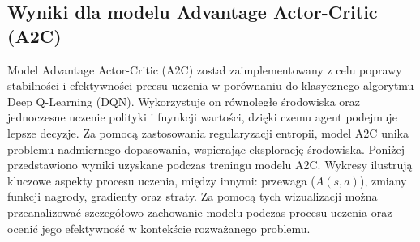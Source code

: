 \documentclass[a4paper, 12pt]{article}
\begin{document}
    \subsection{Wyniki dla modelu Advantage Actor-Critic (A2C)}
    Model Advantage Actor-Critic (A2C) został zaimplementowany z celu poprawy stabilności i efektywności prcesu uczenia w porównaniu do klasycznego algorytmu Deep Q-Learning (DQN).
    Wykorzystuje on równoległe środowiska oraz jednoczesne uczenie polityki i fuynkcji wartości, dzięki czemu agent podejmuje lepsze decyzje. 
    Za pomocą zastosowania regularyzacji entropii, model A2C unika problemu nadmiernego dopasowania, wspierając eksplorację środowiska.
    Poniżej przedstawiono wyniki uzyskane podczas treningu modelu A2C. Wykresy ilustrują kluczowe aspekty procesu uczenia, między innymi: przewaga (\( A(s,a) \)), zmiany funkcji nagrody,
    gradienty oraz straty. Za pomocą tych wizualizacji można przeanalizować szczegółowo zachowanie modelu podczas procesu uczenia oraz ocenić jego efektywność w kontekście rozważanego problemu.\
\end{document}
